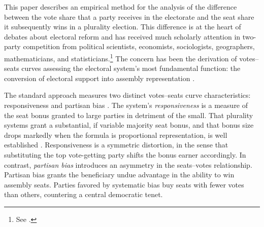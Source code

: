 \documentclass[letter,12pt]{article}
\begin{document}


\onehalfspacing

\noindent This paper describes an empirical method for the analysis of the difference between the vote share that a party receives in the electorate and the seat share it subsequently wins in a plurality election. This difference is at the heart of debates about electoral reform and has received much scholarly attention in two-party competition from political scientists, economists, sociologists, geographers, mathematicians, and statisticians.\footnote{See \citet{altman.mcdonald2011bard,balinskiYoung2001FairRep,brady.grofmanBiasResponsiveness1991,cain.partisanRedistricting.1985,cox.katz.2002,engstrom2006redisttrictApsr,erikson1972malapportionment,gelman.king.1994EvalElSysRedis,grofmanBiasProportionality.1983,grofman.etalBiasMalapp.1997,gudgin.taylor.1980decomposeBias,johnston.2002,kendall.stuartCubeLaw1950,king.browning1987biasRespUS,niemi.fett1986swing,rae.1967,rossiter.etal.1997,taagepera.CubeLaw.1973,trelles.mtz.polygob2012,tufte1973seatsVotes}.\label{fn:cites}} The concern has been the derivation of votes--seats curves assessing the electoral system's most fundamental function: the conversion of electoral support into assembly representation \citep{lijphartElSysPtySys.1994}. 

The standard approach measures two distinct votes--seats curve characteristics: responsiveness and partisan bias \citep{tufte1973seatsVotes,king.browning1987biasRespUS}. The system's \emph{responsiveness} is a measure of the seat bonus granted to large parties in detriment of the small. That plurality systems grant a substantial, if variable majority seat bonus, and that bonus size drops markedly when the formula is proportional representation, is well established \citep{taagepera.shugart.1989,linzerSeatVoteElasticity2012}. Responsiveness is a symmetric distortion, in the sense that substituting the top vote-getting party shifts the bonus earner accordingly. In contrast, \emph{partisan bias} introduces an asymmetry in the seats--votes relationship. Partisan bias grants the beneficiary undue advantage in the ability to win assembly seats. Parties favored by systematic bias buy seats with fewer votes than others, countering a central democratic tenet.
\end{document}
